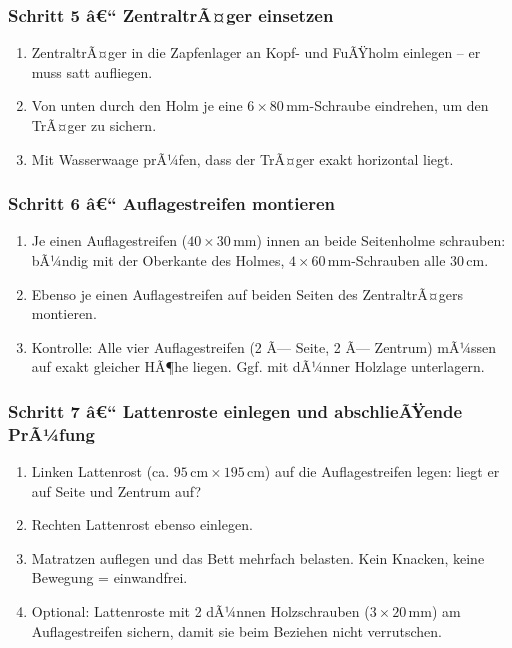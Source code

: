﻿\documentclass[12pt,a4paper]{article}
\theoremstyle{definition}
\theoremstyle{plain}
\theoremstyle{remark}
\begin{document}
\subsubsection*{Schritt 5 â€“ ZentraltrÃ¤ger einsetzen}

\begin{enumerate}
  \item ZentraltrÃ¤ger in die Zapfenlager an Kopf- und FuÃŸholm
        einlegen -- er muss satt aufliegen.
  \item Von unten durch den Holm je eine $6 \times 80\,\text{mm}$-Schraube
        eindrehen, um den TrÃ¤ger zu sichern.
  \item Mit Wasserwaage prÃ¼fen, dass der TrÃ¤ger exakt horizontal liegt.
\end{enumerate}

\subsubsection*{Schritt 6 â€“ Auflagestreifen montieren}

\begin{enumerate}
  \item Je einen Auflagestreifen ($40 \times 30\,\text{mm}$) innen an beide
        Seitenholme schrauben: bÃ¼ndig mit der Oberkante des Holmes,
        $4 \times 60\,\text{mm}$-Schrauben alle $30\,\text{cm}$.
  \item Ebenso je einen Auflagestreifen auf beiden Seiten des
        ZentraltrÃ¤gers montieren.
  \item Kontrolle: Alle vier Auflagestreifen (2 Ã— Seite, 2 Ã— Zentrum)
        mÃ¼ssen auf exakt gleicher HÃ¶he liegen. Ggf. mit dÃ¼nner Holzlage
        unterlagern.
\end{enumerate}

\subsubsection*{Schritt 7 â€“ Lattenroste einlegen und abschlieÃŸende PrÃ¼fung}

\begin{enumerate}
  \item Linken Lattenrost (ca. $95\,\text{cm} \times 195\,\text{cm}$) auf die
        Auflagestreifen legen: liegt er auf Seite und Zentrum auf?
  \item Rechten Lattenrost ebenso einlegen.
  \item Matratzen auflegen und das Bett mehrfach belasten.
        Kein Knacken, keine Bewegung = einwandfrei.
  \item Optional: Lattenroste mit 2 dÃ¼nnen Holzschrauben ($3 \times 20\,\text{mm}$)
        am Auflagestreifen sichern, damit sie beim Beziehen nicht
        verrutschen.
\end{enumerate}
\end{document}
